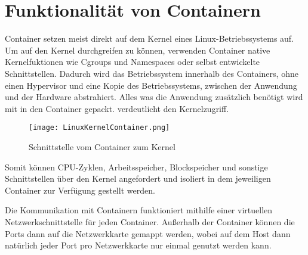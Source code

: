 \section{Funktionalität von Containern}
\label{sec:Funktionalität von Container}

Container setzen meist direkt auf dem Kernel eines Linux-Betriebssystems auf. Um auf den Kernel durchgreifen zu können, verwenden Container native Kernelfuktionen wie Cgroups und Namespaces oder selbst entwickelte Schnittstellen. Dadurch wird das Betriebssystem innerhalb des Containers, ohne einen Hypervisor und eine Kopie des Betriebssystems, zwischen der Anwendung und der Hardware abstrahiert. Alles was die Anwendung zusätzlich benötigt wird mit in den Container gepackt. \cite{10228802020150501}  verdeutlicht den Kernelzugriff.

\begin{figure}[H]
	\begin{center}
		\texttt{[image: LinuxKernelContainer.png]}
	\end{center}
	\caption[Beispielhafte Schnittstellen vom Container zum Kernel]{Schnittstelle vom Container zum Kernel \footnotemark}
	\label{fig:linuxkernelcontainer}
\end{figure}
Somit können CPU-Zyklen, Arbeitsspeicher, Blockspeicher und sonstige Schnittstellen über den Kernel angefordert und isoliert in dem jeweiligen Container zur Verfügung gestellt werden. \cite{12059254020170101}

Die Kommunikation mit Containern funktioniert mithilfe einer virtuellen Netzwerkschnittstelle für jeden Container. Außerhalb der Container können die Ports dann auf die Netzwerkkarte gemappt werden, wobei auf dem Host dann natürlich jeder Port pro Netzwerkkarte nur einmal genutzt werden kann. \cite{10228802020150501}

